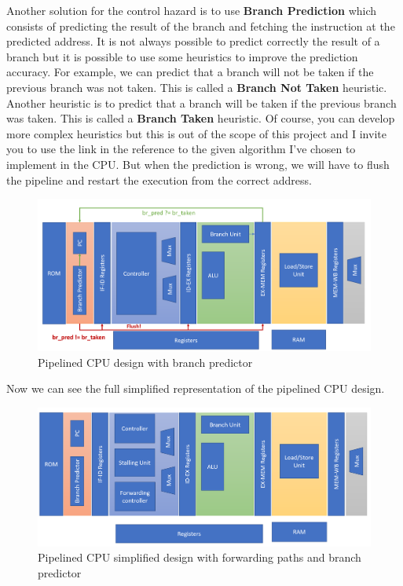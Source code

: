 Another solution for the control hazard is to use \textbf{Branch Prediction} which consists of predicting the result of the branch and fetching the instruction at the predicted address.
It is not always possible to predict correctly the result of a branch but it is possible to use some heuristics to improve the prediction accuracy. For example, we can predict that a branch will not be taken
if the previous branch was not taken. This is called a \textbf{Branch Not Taken} heuristic. Another heuristic is to predict that a branch will be taken if the previous branch was taken. This is called a \textbf{Branch Taken} heuristic.
Of course, you can develop more complex heuristics but this is out of the scope of this project and I invite you to use the link in the reference to the given algorithm I've chosen 
to implement in the CPU\@. But when the prediction is wrong, we will have to flush the pipeline and restart the execution from the correct address. \\

\begin{figure}[H]
    \centering
    \includegraphics[width=1\textwidth]{design/pipelined/images/pipelined_design_predictor.png}
    \caption{Pipelined CPU design with branch predictor}
    \label{fig:pipelined_cpu_design_predictor}
\end{figure} 

Now we can see the full simplified representation of the pipelined CPU design. 
\begin{figure}[H]
    \centering
    \includegraphics[width=1\textwidth]{design/pipelined/images/pipelined_design_full.png}
    \caption{Pipelined CPU simplified design with forwarding paths and branch predictor}
    \label{fig:pipelined_cpu_design_full}
\end{figure}

